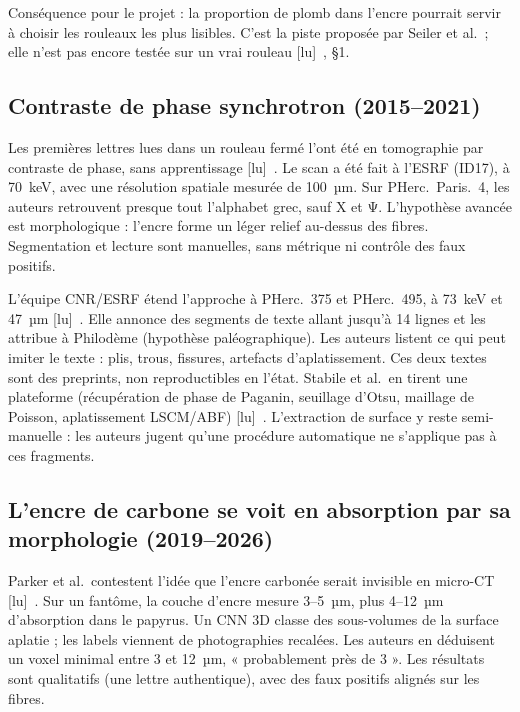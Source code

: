 \documentclass[11pt,a4paper]{article}
\newcommand{\lu}{\textsf{\small[lu]}}
\newcommand{\pherc}[1]{PHerc.~#1}
\begin{document}
Conséquence pour le projet : la proportion de plomb dans l'encre pourrait servir à choisir
les rouleaux les plus lisibles. C'est la piste proposée par Seiler et al.\ ; elle n'est pas
encore testée sur un vrai rouleau \lu~\cite{seiler2026}, §1.

\subsection{Contraste de phase synchrotron (2015–2021)}

Les premières lettres lues dans un rouleau fermé l'ont été en tomographie par contraste de
phase, sans apprentissage \lu~\cite{mocella2015}. Le scan a été fait à l'ESRF (ID17), à
70~keV, avec une résolution spatiale mesurée de 100~µm. Sur \pherc{Paris.~4}, les auteurs
retrouvent presque tout l'alphabet grec, sauf X et Ψ. L'hypothèse avancée est morphologique :
l'encre forme un léger relief au-dessus des fibres. Segmentation et lecture sont manuelles,
sans métrique ni contrôle des faux positifs.

L'équipe CNR/ESRF étend l'approche à \pherc{375} et \pherc{495}, à 73~keV et 47~µm
\lu~\cite{bukreeva2016,bukreeva2017}. Elle annonce des segments de texte allant jusqu'à
14 lignes et les attribue à Philodème (hypothèse paléographique). Les auteurs listent ce qui
peut imiter le texte : plis, trous, fissures, artefacts d'aplatissement. Ces deux textes sont
des preprints, non reproductibles en l'état. Stabile et al.\ en tirent une plateforme
(récupération de phase de Paganin, seuillage d'Otsu, maillage de Poisson, aplatissement
LSCM/ABF) \lu~\cite{stabile2021}. L'extraction de surface y reste semi-manuelle : les
auteurs jugent qu'une procédure automatique ne s'applique pas à ces fragments.

\subsection{L'encre de carbone se voit en absorption par sa morphologie (2019–2026)}

Parker et al.\ contestent l'idée que l'encre carbonée serait invisible en micro-CT
\lu~\cite{parker2019}. Sur un fantôme, la couche d'encre mesure 3–5~µm, plus 4–12~µm
d'absorption dans le papyrus. Un CNN 3D classe des sous-volumes de la surface aplatie ; les
labels viennent de photographies recalées. Les auteurs en déduisent un voxel minimal entre
3 et 12~µm, « probablement près de 3 ». Les résultats sont qualitatifs (une lettre
authentique), avec des faux positifs alignés sur les fibres.
\end{document}
